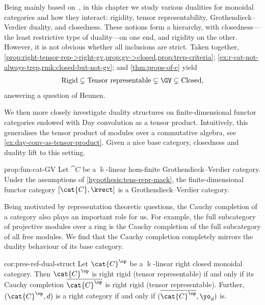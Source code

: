 Being mainly based on~\cite{halbig23:dualit-monoid-categ},
in this chapter we study various dualities for monoidal categories and how they interact:
rigidity, tensor representability, Grothendieck–Verdier duality, and closedness.
These notions form a hierarchy,
with closedness—the least restrictive type of duality—on one end,
and rigidity on the other.
However, it is not obvious whether all inclusions are strict.
Taken together,
\cref{prop:right-tensor-rep->right-gv,prop:gv->closed,prop:trep-criteria};
\cref{ex:r-cat-not-always-trep,rmk:closed-but-not-gv}; and
\cref{thm:props-of-c}
yield
\[
  \text{Rigid}
  \subsetneq \text{Tensor representable}
  \subsetneq \text{\GV}
  \subsetneq \text{Closed},
\]
answering a question of Heunen.

We then more closely investigate duality structures
on finite\hyp{}dimensional functor categories
endowed with Day convolution as a tensor product.
Intuitively, this generalises the tensor product of modules over a commutative algebra,
see \cref{ex:day-conv-as-tensor-product}.
Given a nice base category,
closedness and \GV{} duality
lift to this setting.

\begin{reptheorem}{prop:fun-cat-GV}
  Let \(\cat{C}\) be a \(\Bbbk\)\hyp{}linear hom-finite Grothendieck–Verdier category.
  Under the assumptions of \cref{hypothesis:tens-repr-mack},
  the finite-dimensional functor category \([\cat{C}, \kvect]\) is a Grothendieck–Verdier category.
\end{reptheorem}

Being motivated by representation theoretic questions,
the Cauchy completion of a category
also plays an important role for us.
For example,
the full subcategory of projective modules over a ring
is the Cauchy completion of
the full subcategory of all free modules.
We find that the Cauchy completion completely mirrors the duality behaviour of its base category.

\begin{reptheorem}{cor:pres-ref-dual-struct}
  Let \(\cat{C}^{\op}\) be a \(\Bbbk\)\hyp{}linear right closed monoidal category.
  Then \(\cat{C}^{\op}\) is right rigid (tensor representable)
  if and only if
  its Cauchy completion \(\overline{\cat{C}^{\op}}\) is right rigid (tensor representable).
  Further, \((\cat{C}^{\op}, d)\) is a right \GV{} category
  if and only if
  \((\overline{\cat{C}^{\op}}, \yo_{d})\) is.
\end{reptheorem}

